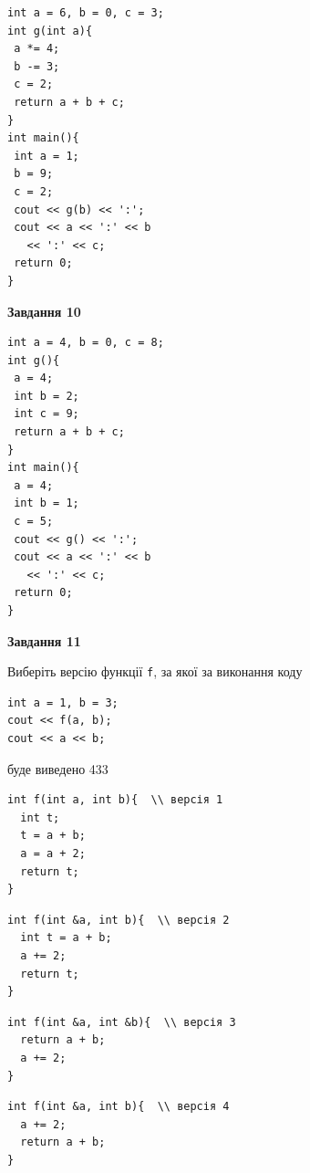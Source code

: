 \documentclass[12pt, ukrainian]{article}
\def\code#1{\Verb!#1!}
\begin{document}
{\begin {large}
\begin{minipage}[t]{7.0cm}
\begin{verbatim}
int a = 6, b = 0, c = 3;
int g(int a){
 a *= 4;
 b -= 3;
 c = 2;
 return a + b + c;
}
int main(){
 int a = 1;
 b = 9;
 c = 2;
 cout << g(b) << ':';
 cout << a << ':' << b 
   << ':' << c;
 return 0;
}
\end{verbatim}



\begin{center}
\textbf{Завдання 10}
\end{center}
\vspace{-8mm}

\begin{verbatim}
int a = 4, b = 0, c = 8;
int g(){
 a = 4;
 int b = 2;
 int c = 9;
 return a + b + c;
}
int main(){
 a = 4;
 int b = 1;
 c = 5;
 cout << g() << ':';
 cout << a << ':' << b 
   << ':' << c;
 return 0;
}
\end{verbatim}

\end{minipage}
\vline \hspace{1mm}
\begin{minipage}[t]{11.0cm}

\begin{center}
\textbf{Завдання 11}
\end{center}
Виберіть версію функції \code{f}, за якої за виконання коду
\begin{verbatim}
int a = 1, b = 3;
cout << f(a, b);
cout << a << b;
\end{verbatim}

буде виведено 433

\begin{verbatim}
int f(int a, int b){  \\ версія 1
  int t;
  t = a + b;
  a = a + 2;
  return t;
}
\end{verbatim}

\vspace{-8mm}\begin{verbatim}
int f(int &a, int b){  \\ версія 2
  int t = a + b;
  a += 2;
  return t;
}
\end{verbatim}

\vspace{-8mm}\begin{verbatim}
int f(int &a, int &b){  \\ версія 3
  return a + b;
  a += 2;
}
\end{verbatim}

\vspace{-8mm}\begin{verbatim}
int f(int &a, int b){  \\ версія 4
  a += 2;
  return a + b;
}
\end{verbatim}




\end{minipage}
\end{large}}
\end{document}
